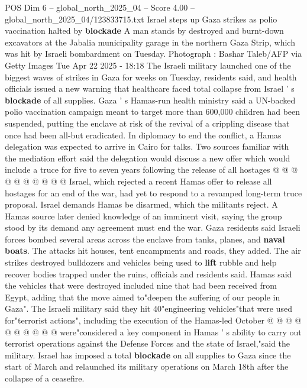 \begin{textsample}{POS Dim 6 – global\_north\_2025\_04 – Score 4.00 – global\_north\_2025\_04/123833715.txt}  \label{ex:f6_pos_198}
Israel steps up Gaza strikes as polio vaccination halted by \textbf{blockade} A man stands by destroyed and burnt-down excavators at the Jabalia municipality garage in the northern Gaza Strip, which was hit by Israeli bombardment on Tuesday.
Photograph : Bashar Taleb/AFP via Getty Images Tue Apr 22 2025 - 18:18 The Israeli military launched one of the biggest waves of strikes in Gaza for weeks on Tuesday, residents said, and health officials issued a new warning that healthcare faced total collapse from Israel ' s \textbf{blockade} of all supplies.
Gaza ' s Hamas-run health ministry said a UN-backed polio vaccination campaign meant to target more than 600,000 children had been suspended, putting the enclave at risk of the revival of a crippling disease that once had been all-but eradicated.
In diplomacy to end the conflict, a Hamas delegation was expected to arrive in Cairo for talks.
Two sources familiar with the mediation effort said the delegation would discuss a new offer which would include a truce for five to seven years following the release of all hostages @ @ @ @ @ @ @ @ @ @ Israel, which rejected a recent Hamas offer to release all hostages for an end of the war, had yet to respond to a revamped long-term truce proposal.
Israel demands Hamas be disarmed, which the militants reject.
A Hamas source later denied knowledge of an imminent visit, saying the group stood by its demand any agreement must end the war.
Gaza residents said Israeli forces bombed several areas across the enclave from tanks, planes, and \textbf{naval} \textbf{boats}.
The attacks hit houses, tent encampments and roads, they added.
The air strikes destroyed bulldozers and vehicles being used to \textbf{lift} rubble and help recover bodies trapped under the ruins, officials and residents said.
Hamas said the vehicles that were destroyed included nine that had been received from Egypt, adding that the move aimed to"deepen the suffering of our people in Gaza".
The Israeli military said they hit 40"engineering vehicles"that were used for"terrorist actions", including the execution of the Hamas-led October @ @ @ @ @ @ @ @ @ @ were"considered a key component in Hamas ' s ability to carry out terrorist operations against the Defense Forces and the state of Israel,"said the military.
Israel has imposed a total \textbf{blockade} on all supplies to Gaza since the start of March and relaunched its military operations on March 18th after the collapse of a ceasefire.

\end{textsample}
